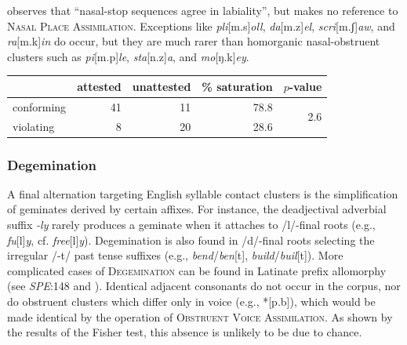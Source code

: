 \citet[175]{Pierrehumbert1994} observes that ``nasal-stop sequences agree in labiality'', but makes no reference to \textsc{Nasal Place Assimilation}. Exceptions like \emph{pli}[m.s]\emph{oll}, \emph{da}[m.z]\emph{el}, \emph{scri}[m.ʃ]\emph{aw}, and \emph{ra}[m.k]\emph{in} do occur, but they are much rarer than homorganic nasal-obstruent clusters such as \emph{pi}[m.p]\emph{le}, \emph{sta}[n.z]\emph{a}, and \emph{mo}[ŋ.k]\emph{ey}.

\begin{example}
\begin{tabular}{l r r r r}
\toprule
           & attested & unattested & \% saturation & $p$-value                   \\
\midrule
conforming & 41       & 11         & 78.8          & \multirow{2}{*}{2.6\e{-05}} \\
violating  & 8        & 20         & 28.6                                    \\
\bottomrule
\end{tabular}
\end{example}

\subsubsection{Degemination} \label{deg}

A final alternation targeting English syllable contact clusters is the simplification of geminates derived by certain affixes. For instance, the deadjectival adverbial suffix \emph{-ly} rarely produces a geminate when it attaches to /l/-final roots (e.g., \emph{fu}[l]\emph{y}, cf. \emph{free}[l]\emph{y}). Degemination is also found in /d/-final roots selecting the irregular /-t/ past tense suffixes (e.g., \emph{bend}/\emph{ben}[t], \emph{build}/\emph{buil}[t]). More complicated cases of \textsc{Degemination} can be found in Latinate prefix allomorphy (see \emph{SPE}:148 and \citealt[102]{Borowsky1986}). Identical adjacent consonants do not occur in the corpus, nor do obstruent clusters which differ only in voice (e.g., *[p.b]), which would be made identical by the operation of \textsc{Obstruent Voice Assimilation}. As shown by the results of the Fisher test, this absence is unlikely to be due to chance.

